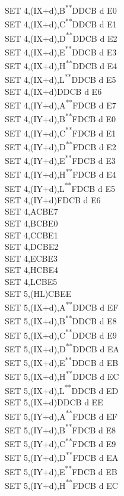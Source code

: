\documentclass[12pt,twoside,openright,a4paper]{book}
\newcommand{\UNDOC}{\textnormal{\textsuperscript{**}}}
\begin{document}
\begin{multicols}{3}
{\begin{tabbing}
	SET 4,(IX+d),B\UNDOC\>DDCB d E0\\
	SET 4,(IX+d),C\UNDOC\>DDCB d E1\\
	SET 4,(IX+d),D\UNDOC\>DDCB d E2\\
	SET 4,(IX+d),E\UNDOC\>DDCB d E3\\
	SET 4,(IX+d),H\UNDOC\>DDCB d E4\\
	SET 4,(IX+d),L\UNDOC\>DDCB d E5\\
	SET 4,(IX+d)\>DDCB d E6\\
	SET 4,(IY+d),A\UNDOC\>FDCB d E7\\
	SET 4,(IY+d),B\UNDOC\>FDCB d E0\\
	SET 4,(IY+d),C\UNDOC\>FDCB d E1\\
	SET 4,(IY+d),D\UNDOC\>FDCB d E2\\
	SET 4,(IY+d),E\UNDOC\>FDCB d E3\\
	SET 4,(IY+d),H\UNDOC\>FDCB d E4\\
	SET 4,(IY+d),L\UNDOC\>FDCB d E5\\
	SET 4,(IY+d)\>FDCB d E6\\
	SET 4,A\>CBE7\\
	SET 4,B\>CBE0\\
	SET 4,C\>CBE1\\
	SET 4,D\>CBE2\\
	SET 4,E\>CBE3\\
	SET 4,H\>CBE4\\
	SET 4,L\>CBE5\\
	SET 5,(HL)\>CBEE\\
	SET 5,(IX+d),A\UNDOC\>DDCB d EF\\
	SET 5,(IX+d),B\UNDOC\>DDCB d E8\\
	SET 5,(IX+d),C\UNDOC\>DDCB d E9\\
	SET 5,(IX+d),D\UNDOC\>DDCB d EA\\
	SET 5,(IX+d),E\UNDOC\>DDCB d EB\\
	SET 5,(IX+d),H\UNDOC\>DDCB d EC\\
	SET 5,(IX+d),L\UNDOC\>DDCB d ED\\
	SET 5,(IX+d)\>DDCB d EE\\
	SET 5,(IY+d),A\UNDOC\>FDCB d EF\\
	SET 5,(IY+d),B\UNDOC\>FDCB d E8\\
	SET 5,(IY+d),C\UNDOC\>FDCB d E9\\
	SET 5,(IY+d),D\UNDOC\>FDCB d EA\\
	SET 5,(IY+d),E\UNDOC\>FDCB d EB\\
	SET 5,(IY+d),H\UNDOC\>FDCB d EC\\

\end{tabbing}}
\end{multicols}
\end{document}
